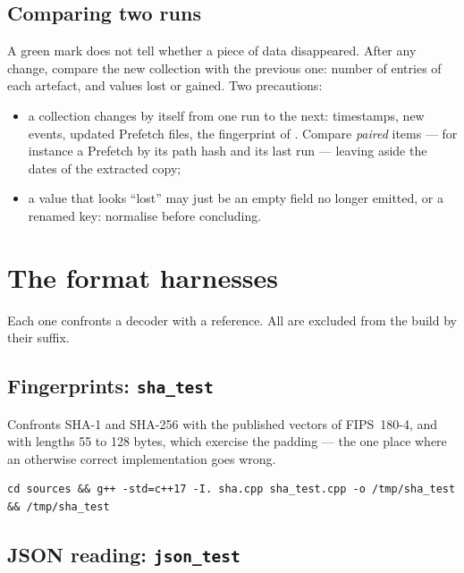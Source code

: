 \documentclass[11pt,a4paper,oneside]{report}
\begin{document}
\section{Comparing two runs}\label{sec:comparer}

A green mark does not tell whether a piece of data disappeared. After any
change, compare the new collection with the previous one: number of entries of
each artefact, and values lost or gained. Two precautions:

\begin{itemize}
  \item a collection changes by itself from one run to the next: timestamps,
    new events, updated Prefetch files, the fingerprint of .
    Compare \emph{paired} items — for instance a Prefetch by its path hash and
    its last run — leaving aside the dates of the extracted copy;
  \item a value that looks ``lost'' may just be an empty field no longer emitted, or a
    renamed key: normalise before concluding.
\end{itemize}

\chapter{The format harnesses}\label{ch:format}

Each one confronts a \wac{} decoder with a reference. All are excluded from the
\wac{} build by their  suffix.

\section{Fingerprints: \texttt{sha\_test}}

Confronts SHA-1 and SHA-256 with the published vectors of FIPS~180-4, and with
lengths 55 to 128 bytes, which exercise the padding — the one place where an
otherwise correct implementation goes wrong.

\begin{lstlisting}
cd sources && g++ -std=c++17 -I. sha.cpp sha_test.cpp -o /tmp/sha_test && /tmp/sha_test
\end{lstlisting}

\section{JSON reading: \texttt{json\_test}}
\end{document}
